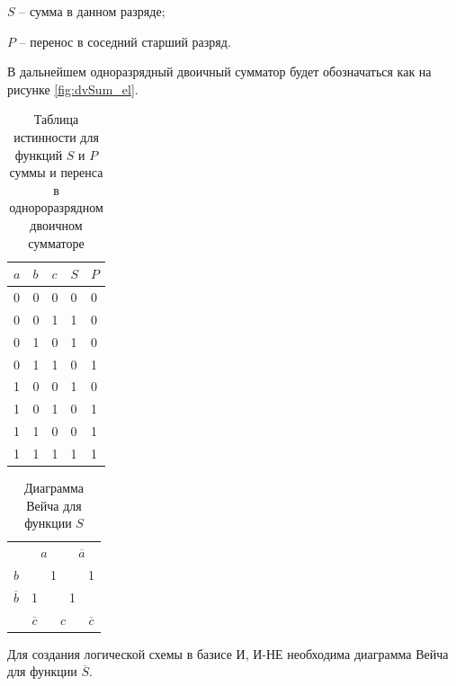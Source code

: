 \documentclass[a4paper,14pt]{article}
\begin{document}
$S$ -- сумма в данном разряде;

$P$ -- перенос в соседний старший разряд.

В дальнейшем одноразрядный двоичный сумматор будет обозначаться как на рисунке \ref{fig:dvSum_el}.

\begin{table}[H]
\begin{center}
	\caption{\label{tab:dvSum} Таблица истинности для функций $S$ и $P$ суммы и перенса в однороразрядном двоичном сумматоре}
	\begin{tabular}{|l|l|l|l|l|}
		\hline
		$a$ & $b$ & $c$ & $S$ & $P$ \\ \hline
		0 & 0 & 0 & 0 & 0 \\ \hline
		0 & 0 & 1 & 1 & 0 \\ \hline
		0 & 1 & 0 & 1 & 0 \\ \hline
		0 & 1 & 1 & 0 & 1 \\ \hline
		1 & 0 & 0 & 1 & 0 \\ \hline
		1 & 0 & 1 & 0 & 1 \\ \hline
		1 & 1 & 0 & 0 & 1 \\ \hline
		1 & 1 & 1 & 1 & 1 \\ \hline
	\end{tabular}
\end{center}
\end{table}

\begin{table}[H]
	\begin{center}
		\caption{\label{tab:SDvSum} Диаграмма Вейча для функции $S$}
	\begin{tabular}{ccccc}
		& \multicolumn{2}{c}{$a$}                           & \multicolumn{2}{c}{$\overline{a}$}                          \\ \cline{2-5} 
		\multicolumn{1}{c|}{$b$}  & \multicolumn{1}{c|}{}  & \multicolumn{1}{c|}{1} & \multicolumn{1}{c|}{}  & \multicolumn{1}{c|}{1} \\ \cline{2-5} 
		\multicolumn{1}{c|}{$\overline{b}$} & \multicolumn{1}{c|}{1} & \multicolumn{1}{c|}{}  & \multicolumn{1}{c|}{1} & \multicolumn{1}{c|}{}  \\ \cline{2-5} 
		&$\overline{c}$                   & \multicolumn{2}{c}{$c$}                          & $\overline{c}$                    
	\end{tabular}
\end{center}
\end{table}

Для создания логической схемы в базисе И, И-НЕ необходима диаграмма Вейча для функции $\overline{S}$.
\end{document}
